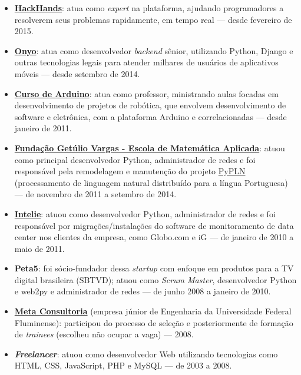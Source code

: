 \documentclass[a4paper,11pt]{article}
\begin{document}
	\begin{itemize}
		\item \href{http://hackhands.com}{\textbf{HackHands}}: atua como
			\textit{expert} na plataforma, ajudando programadores a resolverem
			seus problemas rapidamente, em tempo real --- desde fevereiro de
			2015.
		\item \href{http://onyo.com}{\textbf{Onyo}}: atua como desenvolvedor
			\textit{backend} sênior, utilizando Python, Django e outras
			tecnologias legais para atender milhares de usuários de aplicativos
			móveis --- desde setembro de 2014.
		\item \href{http://www.cursodearduino.com.br/}{\textbf{Curso de
			Arduino}}: atua como professor, ministrando aulas focadas em
			desenvolvimento de projetos de robótica, que envolvem
			desenvolvimento de software e eletrônica, com a plataforma Arduino
			e correlacionadas --- desde janeiro de 2011.
		\item \href{http://emap.fgv.br/}{\textbf{Fundação Getúlio Vargas -
			Escola de Matemática Aplicada}}: atuou como principal desenvolvedor
			Python, administrador de redes e foi responsável pela remodelagem e
			manutenção do projeto \href{http://pypln.org/}{PyPLN}
			(processamento de linguagem natural distribuído para a língua
			Portuguesa) --- de novembro de 2011 a setembro de 2014.
		\item \href{http://www.intelie.com.br/}{\textbf{Intelie}}: atuou como
			desenvolvedor Python, administrador de redes e foi responsável por
			migrações/instalações do software de monitoramento de data center
			nos clientes da empresa, como Globo.com e iG --- de janeiro de 2010
			a maio de 2011.
		\item \textbf{Peta5}: foi sócio-fundador dessa \textit{startup} com
			enfoque em produtos para a TV digital brasileira (SBTVD); atuou
			como \textit{Scrum Master}, desenvolvedor Python e web2py e
			administrador de redes --- de junho 2008 a janeiro de 2010.
		\item \href{http://www.metaconsultoria.com/}{\textbf{Meta Consultoria}}
			(empresa júnior de Engenharia da Universidade Federal Fluminense):
			participou do processo de seleção e posteriormente de formação de
			\textit{trainees} (escolheu não ocupar a vaga) --- 2008.
		\item \textbf{\textit{Freelancer}}: atuou como desenvolvedor Web
			utilizando tecnologias como HTML, CSS, JavaScript, PHP e MySQL ---
			de 2003 a 2008.
	\end{itemize}
\end{document}
